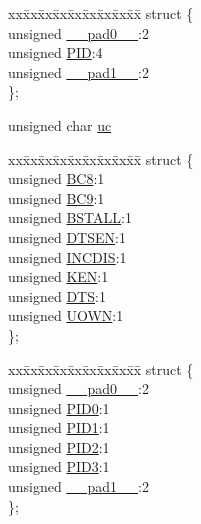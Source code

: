 \begin{DoxyCompactItemize}
\begin{tabbing}
\end{tabbing}\item 
\begin{tabbing}
xx\=xx\=xx\=xx\=xx\=xx\=xx\=xx\=xx\=\kill
struct \{\\
\>unsigned \hyperlink{union_b_d_stat_adf71f3d8410c1f1dbbc96680a92c49af}{\_\_pad0\_\_}:2\\
\>unsigned \hyperlink{union_b_d_stat_a97b41b25e06fd7857dcc6217c160a8ad}{PID}:4\\
\>unsigned \hyperlink{union_b_d_stat_acaf2d0924a107ec6e8d2e31febaf66f9}{\_\_pad1\_\_}:2\\
\}; \\

\end{tabbing}\item 
unsigned char \hyperlink{union_b_d_stat_a4fb356afd2995f305b7124aeb0cb5152}{uc}
\item 
\begin{tabbing}
xx\=xx\=xx\=xx\=xx\=xx\=xx\=xx\=xx\=\kill
struct \{\\
\>unsigned \hyperlink{union_b_d_stat_a5d5010d284e6c86702a4ce3063f4cca5}{BC8}:1\\
\>unsigned \hyperlink{union_b_d_stat_af499c0fe1fd8eba827eb024bf69841e9}{BC9}:1\\
\>unsigned \hyperlink{union_b_d_stat_a145ee75f12c62d2a89097d18477019f2}{BSTALL}:1\\
\>unsigned \hyperlink{union_b_d_stat_adeff6f5de2d8ca0cfa956560288c3541}{DTSEN}:1\\
\>unsigned \hyperlink{union_b_d_stat_a39604d4252cc3e5f9551bd2cd3b54584}{INCDIS}:1\\
\>unsigned \hyperlink{union_b_d_stat_aaf39e9ac8929e7da9cb427f1b0de0934}{KEN}:1\\
\>unsigned \hyperlink{union_b_d_stat_a74db087bfe32cd33c459191f7a4aeb13}{DTS}:1\\
\>unsigned \hyperlink{union_b_d_stat_abc982c28d59f8e36dbcb06639010169d}{UOWN}:1\\
\}; \\

\end{tabbing}\item 
\begin{tabbing}
xx\=xx\=xx\=xx\=xx\=xx\=xx\=xx\=xx\=\kill
struct \{\\
\>unsigned \hyperlink{union_b_d_stat_adf71f3d8410c1f1dbbc96680a92c49af}{\_\_pad0\_\_}:2\\
\>unsigned \hyperlink{union_b_d_stat_a810a2f6d15fc42c5d1e610b6e927d2eb}{PID0}:1\\
\>unsigned \hyperlink{union_b_d_stat_acefd8c6eba334031c18cd877dfe08bfb}{PID1}:1\\
\>unsigned \hyperlink{union_b_d_stat_aef3d6a9445a3c61d870212360c0a6110}{PID2}:1\\
\>unsigned \hyperlink{union_b_d_stat_a771971768126aebea428ac7194b17fc0}{PID3}:1\\
\>unsigned \hyperlink{union_b_d_stat_acaf2d0924a107ec6e8d2e31febaf66f9}{\_\_pad1\_\_}:2\\
\}; \\


\end{tabbing}
\end{DoxyCompactItemize}
